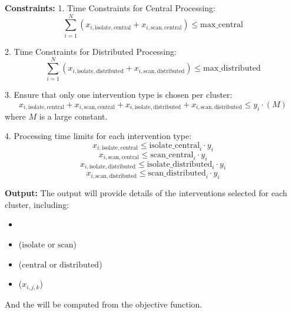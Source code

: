 \documentclass{article}
\begin{document}
\textbf{Constraints:}
1. Time Constraints for Central Processing:
\[
\sum_{i=1}^{N} (x_{i,\text{isolate},\text{central}} + x_{i,\text{scan},\text{central}}) \leq \text{max\_central}
\]

2. Time Constraints for Distributed Processing:
\[
\sum_{i=1}^{N} (x_{i,\text{isolate},\text{distributed}} + x_{i,\text{scan},\text{distributed}}) \leq \text{max\_distributed}
\]

3. Ensure that only one intervention type is chosen per cluster:
\[
x_{i,\text{isolate},\text{central}} + x_{i,\text{scan},\text{central}} + x_{i,\text{isolate},\text{distributed}} + x_{i,\text{scan},\text{distributed}} \leq y_{i} \cdot (M)
\]
where \( M \) is a large constant.

4. Processing time limits for each intervention type:
\[
x_{i,\text{isolate},\text{central}} \leq \text{isolate\_central}_{i} \cdot y_{i}
\]
\[
x_{i,\text{scan},\text{central}} \leq \text{scan\_central}_{i} \cdot y_{i}
\]
\[
x_{i,\text{isolate},\text{distributed}} \leq \text{isolate\_distributed}_{i} \cdot y_{i}
\]
\[
x_{i,\text{scan},\text{distributed}} \leq \text{scan\_distributed}_{i} \cdot y_{i}
\]

\textbf{Output:}
The output will provide details of the interventions selected for each cluster, including:
\begin{itemize}
    \item {}
    \item {} ($\text{isolate}$ or $\text{scan}$)
    \item {} ($\text{central}$ or $\text{distributed}$)
    \item {} ($x_{i,j,k}$)
\end{itemize}
And the  will be computed from the objective function.
\end{document}
